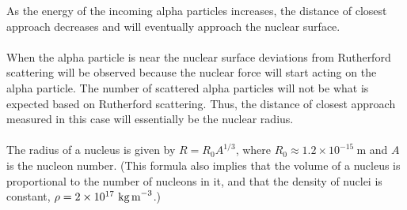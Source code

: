 \documentclass[a4paper,12pt]{article}
\begin{document}
As the energy of the incoming alpha particles increases, the distance of closest approach decreases and will eventually approach the nuclear surface. \\\\
When the alpha particle is near the nuclear surface deviations from Rutherford scattering will be observed because the nuclear force will start acting on the alpha particle. The number of scattered alpha particles will not be what is expected based on Rutherford scattering. Thus, the distance of closest approach measured in this case will essentially be the nuclear radius.\\\\
The radius of a nucleus is given by $R=R_0 A^{1/3}$, where $R_0\approx 1.2\times 10^{-15}\ \text{m}$ and $A$ is the nucleon number. (This formula also implies that the volume of a nucleus is proportional to the number of nucleons in it, and that the density of nuclei is constant, $\rho=2\times 10^{17}\ \text{kg\,m}^{-3}$.)
\end{document}
